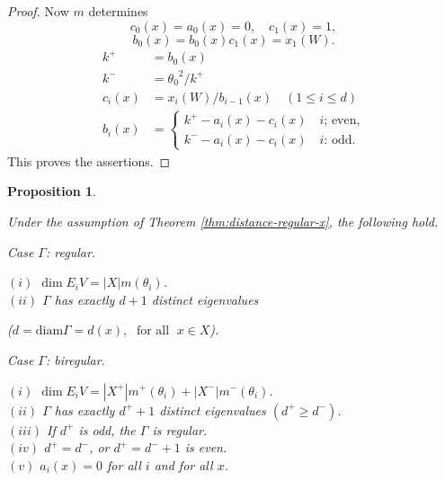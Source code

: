 \documentclass[
]{book}
\newtheorem{proposition}{Proposition}[chapter]
\theoremstyle{definition}
\theoremstyle{definition}
\theoremstyle{definition}
\theoremstyle{definition}
\theoremstyle{remark}
\begin{document}
\begin{proof}
Now \(m\) determines
\[c_0(x) = a_0(x) = 0,\quad c_1(x) = 1,\]
\[b_0(x) = b_0(x)c_1(x) = x_1(W).\]
\begin{align}
k^+ & = b_0(x)\\
k^- & = {\theta_0}^2/k^+\\
c_i(x) & = x_i(W)/b_{i-1}(x) \quad (1\leq i\leq d)\\
b_i(x) & = \begin{cases} k^+ - a_i(x) - c_i(x) \quad \text{$i$; even,}\\
k^--a_i(x)-c_i(x) \quad \text{$i$: odd}.
\end{cases}
\end{align}
This proves the assertions.
\end{proof}

\begin{proposition}
\protect\hypertarget{prp:dim-diameter}{}\label{prp:dim-diameter}

Under the assumption of Theorem \ref{thm:distance-regular-x}, the following hold.

Case \(\Gamma\): regular.

\((i)\) \(\dim E_iV = |X|m(\theta_i)\).\\
\((ii)\) \(\Gamma\) has exactly \(d+1\) distinct eigenvalues

(\(d = \mathrm{diam}\Gamma = d(x), \; \text{ for all }\; x\in X\)).

Case \(\Gamma\): biregular.

\((i)\) \(\dim E_iV = |X^+| m^+(\theta_i) + |X^-|m^-(\theta_i)\).\\
\((ii)\) \(\Gamma\) has exactly \(d^++1\) distinct eigenvalues \((d^+\geq d^-)\).\\
\((iii)\) If \(d^+\) is odd, the \(\Gamma\) is regular.\\
\((iv)\) \(d^+ = d^-\), or \(d^+ = d^-+1\) is even.\\
\((v)\) \(a_i(x) = 0\) for all \(i\) and for all \(x\).

\end{proposition}
\end{document}
